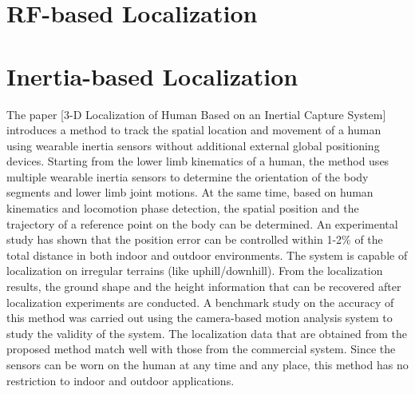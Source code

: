 \documentclass[12pt]{report}
\begin{document}

\iffalse

\section{RF-based Localization}


\section{Inertia-based Localization}
The paper [3-D Localization of Human Based on an Inertial Capture System] introduces a method to track the spatial location and movement of a human using wearable inertia sensors without additional external global positioning devices. Starting from the lower limb kinematics of a human, the method uses multiple wearable inertia sensors to determine the orientation of the body segments and lower limb joint motions. At the same time, based on human kinematics and locomotion phase detection, the spatial position and the trajectory of a reference point on the body can be determined. An experimental study has shown that the position error can be controlled within 1-2\% of the total distance in both indoor and outdoor environments. The system is capable of localization on irregular terrains (like uphill/downhill). From the localization results, the ground shape and the height information that can be recovered after localization experiments are conducted. A benchmark study on the accuracy of this method was carried out using the camera-based motion analysis system to study the validity of the system. The localization data that are obtained from the proposed method match well with those from the commercial system. Since the sensors can be worn on the human at any time and any place, this method has no restriction to indoor and outdoor applications.
\end{document}

